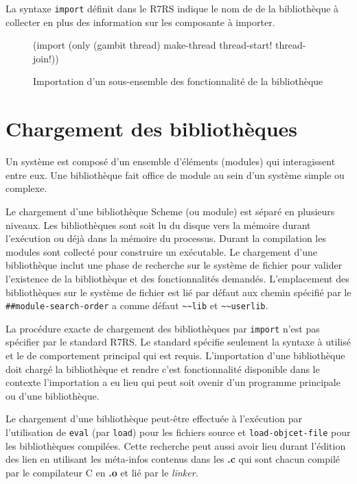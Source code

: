 La syntaxe \lstinline{import} définit dans le R7RS indique le nom de
de la bibliothèque à collecter en plus des information sur les composante
à importer.
\begin{figure}[ht]
  \begin{mplisting}{0.9}
(import (only (gambit thread) make-thread thread-start! thread-join!))
\end{mplisting}
  \caption{Importation d'un sous-ensemble des fonctionnalité de la bibliothèque}
\end{figure}


\section{Chargement des bibliothèques}


Un système est composé d'un ensemble d'éléments (modules) qui interagissent
entre eux.  Une bibliothèque fait office de module au sein d'un système simple
ou complexe.

Le chargement d'une bibliothèque Scheme (ou module) est séparé en plusieurs niveaux.
Les bibliothèques sont soit lu du disque vers la mémoire durant l'exécution
ou déjà dans la mémoire du processus. Durant la compilation les modules sont
collecté pour construire un exécutable. Le chargement
d'une bibliothèque inclut une phase de recherche sur le système de fichier pour valider
l'existence de la bibliothèque et des fonctionnalités demandés. L'emplacement des
bibliothèques sur le système de fichier est lié par défaut aux chemin spécifié par
le \lstinline{##module-search-order} a comme défaut \lstinline{~~lib} et \lstinline{~~userlib}.


La procédure exacte de chargement des bibliothèques par \verb|import|
n'est pas spécifier par le standard R7RS. Le standard spécifie seulement la syntaxe
à utilisé et le de comportement principal qui est
requis. L'importation d'une bibliothèque doit chargé la bibliothèque
et rendre c'est fonctionnalité disponible dans le contexte
l'importation a eu lieu qui peut soit ovenir d'un programme principale
ou d'une bibliothèque.

Le chargement d'une bibliothèque peut-être effectuée à l'exécution par
l'utilisation de \texttt{eval} (par \texttt{load}) pour les fichiers source et
\texttt{load-objcet-file} pour les bibliothèques compilées. Cette recherche
peut aussi avoir lieu durant l'édition des lien en utilisant les méta-infos
contenus dans les \textbf{.c} qui sont chacun compilé par le compilateur C
en \textbf{.o} et lié par le \textit{linker}.

